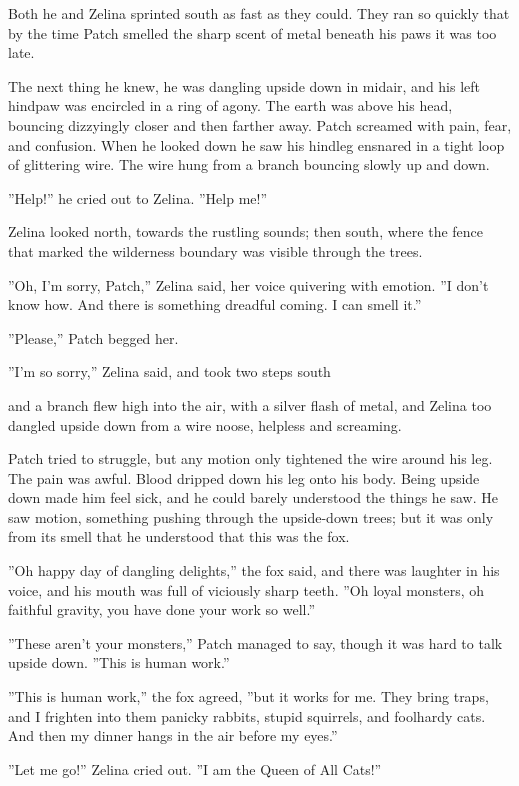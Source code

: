 \documentclass[12pt]{book}
\begin{document}
Both he and Zelina sprinted south as fast as they could. They ran so quickly that by the time Patch smelled the sharp scent of metal beneath his paws it was too late.\par
The next thing he knew, he was dangling upside down in midair, and his left hindpaw was encircled in a ring of agony. The earth was above his head, bouncing dizzyingly closer and then farther away. Patch screamed with pain, fear, and confusion. When he looked down he saw his hindleg ensnared in a tight loop of glittering wire. The wire hung from a branch bouncing slowly up and down.\par
''Help!'' he cried out to Zelina. ''Help me!''\par
Zelina looked north, towards the rustling sounds; then south, where the fence that marked the wilderness boundary was visible through the trees.\par
''Oh, I'm sorry, Patch,'' Zelina said, her voice quivering with emotion. ''I don't know how. And there is something dreadful coming. I can smell it.''\par
''Please,'' Patch begged her.\par
''I'm so sorry,'' Zelina said, and took two steps south %
\par
 and a branch flew high into the air, with a silver flash of metal, and Zelina too dangled upside down from a wire noose, helpless and screaming.\par
Patch tried to struggle, but any motion only tightened the wire around his leg. The pain was awful. Blood dripped down his leg onto his body. Being upside down made him feel sick, and he could barely understood the things he saw. He saw motion, something pushing through the upside-down trees; but it was only from its smell that he understood that this was the fox.\par
''Oh happy day of dangling delights,'' the fox said, and there was laughter in his voice, and his mouth was full of viciously sharp teeth. ''Oh loyal monsters, oh faithful gravity, you have done your work so well.''\par
''These aren't your monsters,'' Patch managed to say, though it was hard to talk upside down. ''This is human work.''\par
''This is human work,'' the fox agreed, ''but it works for me. They bring traps, and I frighten into them panicky rabbits, stupid squirrels, and foolhardy cats. And then my dinner hangs in the air before my eyes.''\par
''Let me go!'' Zelina cried out. ''I am the Queen of All Cats!''\par
\end{document}
